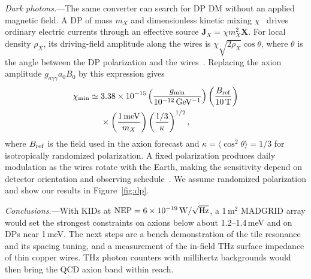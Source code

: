 \documentclass[
  aps,prl,reprint,superscriptaddress,
  amsmath,amssymb,floatfix,nofootinbib
]{revtex4-2}
\newcommand{\gagg}{g_{a\gamma\gamma}}
\begin{document}
\textit{Dark photons.}---The same converter can search for DP DM without an applied magnetic field. A DP of mass $m_X$ and dimensionless kinetic mixing $\chi$~\cite{Holdom:1985ag} drives ordinary electric currents through an effective source $\mathbf J_X=\chi m_X^2\mathbf X$. For local density $\rho_X$, its driving-field amplitude along the wires is $\chi\sqrt{2\rho_X}\cos\theta$, where $\theta$ is the angle between the DP polarization and the wires~\cite{Gelmini:2020kcu,Caputo:2021eaa}. Replacing the axion amplitude $\gagg a_0B_0$ by this expression gives %
\begin{equation}
\begin{aligned}
\chi_{\min}\simeq{}&
3.38\times10^{-15}
\left(\frac{g_{\min}}{10^{-12}\,{\rm GeV^{-1}}}\right)
\left(\frac{B_{\rm ref}}{10\,{\rm T}}\right)
\\
&\times
\left(\frac{1\,{\rm meV}}{m_X}\right)
\left(\frac{1/3}{\kappa}\right)^{1/2},
\end{aligned}
\label{eq:dpmap}
\end{equation}
where $B_{\rm ref}$ is the field used in the axion forecast and $\kappa=\langle\cos^2\theta\rangle=1/3$ for isotropically randomized polarization. A fixed polarization produces daily modulation as the wires rotate with the Earth, making the sensitivity depend on detector orientation and observing schedule~\cite{Caputo:2021eaa}. We assume randomized polarization and show our results in Figure~\ref{fig:dp}. %

\textit{Conclusions.}---With KIDs at ${\rm NEP}=6\times10^{-19}\,{\rm W/\sqrt{Hz}}$, a 1\,m$^2$ MADGRID array would set the strongest constraints on axions below about 1.2--1.4\,meV and on DPs near 1\,meV. The next steps are a bench demonstration of the tile resonance and its spacing tuning, and a measurement of the in-field THz surface impedance of thin copper wires. THz photon counters with millihertz backgrounds would then bring the QCD axion band within reach.
\end{document}
